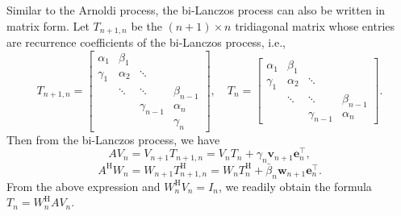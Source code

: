 {Similar to the Arnoldi process, the bi-Lanczos process can also be written in matrix form. Let $T_{n+1,n}$ be the $(n+1)\times n$ tridiagonal matrix whose entries are recurrence coefficients of the bi-Lanczos process, i.e.,}
\[
T_{n+1,n}=\begin{bmatrix}
\alpha_1&\beta_1&&\\
\gamma_1&\alpha_2&\ddots&\\
&\ddots&\ddots&\beta_{n-1}\\
&&\gamma_{n-1}&\alpha_n\\
&&&\gamma_n
\end{bmatrix},\quad
T_n=\begin{bmatrix}
\alpha_1&\beta_1&&\\
\gamma_1&\alpha_2&\ddots&\\
&\ddots&\ddots&\beta_{n-1}\\
&&\gamma_{n-1}&\alpha_n
\end{bmatrix}.
\]
{Then from the bi-Lanczos process, we have}
\begin{equation}\label{eq:bilanczos-matrix-relation}
AV_n=V_{n+1}T_{n+1,n}=V_nT_n+\gamma_n\bm v_{n+1}\bm e_n^\top,
\end{equation}
\[
A^{\mathrm H}W_n=W_{n+1}T_{n+1,n}^{\mathrm H}
=W_nT_n^{\mathrm H}+\bar\beta_n\bm w_{n+1}\bm e_n^\top.
\]
{From the above expression and $W_n^{\mathrm H}V_n=I_n$, we readily obtain the formula $T_n=W_n^{\mathrm H}AV_n$.}
